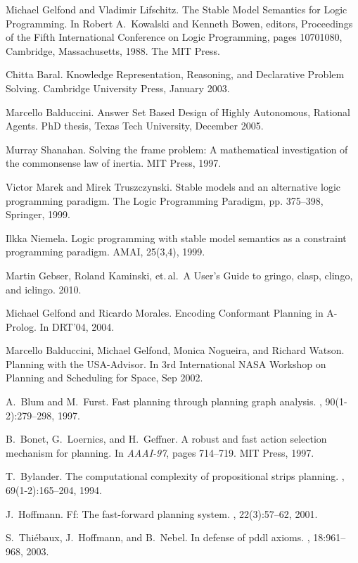 \documentclass{article}
\begin{document}
\begin{thebibliography}{2}

Michael Gelfond and Vladimir Lifschitz.
The Stable Model Semantics for Logic Programming.
In Robert A.\, Kowalski and Kenneth Bowen, editors, Proceedings of the Fifth International Conference on Logic Programming, pages 1070{1080}, Cambridge, Massachusetts, 1988.
The MIT Press.

Chitta Baral.
Knowledge Representation, Reasoning, and Declarative Problem Solving.
Cambridge University Press, January 2003.

Marcello Balduccini.
Answer Set Based Design of Highly Autonomous, Rational Agents.
PhD thesis, Texas Tech University, December 2005.

Murray Shanahan.
Solving the frame problem: A mathematical investigation of the commonsense law of inertia.
MIT Press, 1997.

Victor Marek and Mirek Truszczynski.
Stable models and an alternative logic programming paradigm.
The Logic Programming Paradigm, pp. 375–398, Springer, 1999.

Ilkka Niemela.
Logic programming with stable model semantics as a constraint programming paradigm.
AMAI, 25(3,4), 1999.

Martin Gebser, Roland Kaminski, et.\,al.\,
A User's Guide to gringo, clasp, clingo, and iclingo.
2010.

Michael Gelfond and Ricardo Morales. 
Encoding Conformant Planning in A-Prolog. 
In DRT'04, 2004.

Marcello Balduccini, Michael Gelfond, Monica Nogueira, and Richard Watson.
Planning with the USA-Advisor. 
In 3rd International NASA Workshop on Planning and Scheduling for Space, Sep 2002.

A.~Blum and M.~Furst.
\newblock Fast planning through planning graph analysis.
, 90(1-2):279--298, 1997.

B.~Bonet, G.~Loernics, and H.~Geffner.
\newblock A robust and fast action selection mechanism for planning.
\newblock In {\em AAAI-97}, pages 714--719. MIT Press, 1997.

T.~Bylander.
\newblock The computational complexity of propositional strips planning.
, 69(1-2):165--204, 1994.

J.~Hoffmann.
\newblock Ff: The fast-forward planning system.
, 22(3):57--62, 2001.

S.~Thi{\'e}baux, J.~Hoffmann, and B.~Nebel.
\newblock In defense of pddl axioms.
, 18:961--968, 2003.

\end{thebibliography}


\end{document}
